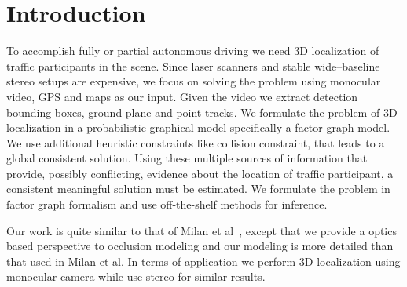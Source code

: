 \section{Introduction}
\label{sec:intro}


        To accomplish fully or partial autonomous driving we need 3D
        localization of traffic participants in the scene. 
        Since laser scanners and stable wide--baseline stereo setups are
        expensive, we focus on solving the problem using monocular video, GPS
        and maps as our input. Given the video we extract detection bounding
        boxes, ground plane and point tracks.
        We formulate the problem of 3D localization in a probabilistic graphical
        model specifically a factor graph model. We use additional heuristic
        constraints like collision constraint, that leads to a global consistent solution.
        Using these multiple sources of information that provide, possibly conflicting, evidence about
        the location of traffic participant, a consistent meaningful solution must be estimated. 
        We formulate the problem in factor graph
        formalism and use off-the-shelf methods for inference.

        Our work is quite similar to that of Milan et
        al~\cite{Milan_etal_2014}, except that we provide a optics based
        perspective to occlusion modeling and our modeling is more detailed
        than that used in Milan et al. In terms of application we perform 3D
        localization using monocular camera while \cite{Geiger_etal_2014} use
        stereo for similar results.

